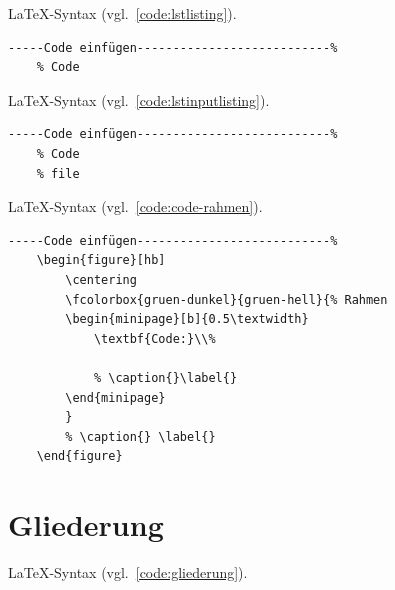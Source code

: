 \LaTeX -Syntax (vgl.~\ref{code:lstlisting}). 

\begin{lstlisting}[caption={lstlisting},label={code:lstlisting},language=TeX% C, TeX, Bash, Python
]-----Code einfügen---------------------------%
	% Code
\end{lstlisting}




\LaTeX -Syntax (vgl.~\ref{code:lstinputlisting}). 

\begin{lstlisting}[caption={lstinputlisting},label={code:lstinputlisting},language=TeX% C, TeX, Bash, Python
]-----Code einfügen---------------------------%
	% Code
	% file
\end{lstlisting}

\clearpage
\begin{figure}[hb]
	\centering
\end{figure}

\LaTeX -Syntax (vgl.~\ref{code:code-rahmen}). 

\begin{lstlisting}[caption={Code im Rahmen},label={code:code-rahmen},language=TeX% C, TeX, Bash, Python
]-----Code einfügen---------------------------%
	\begin{figure}[hb]
		\centering
		\fcolorbox{gruen-dunkel}{gruen-hell}{% Rahmen
		\begin{minipage}[b]{0.5\textwidth} 
			\textbf{Code:}\\%
			
			% \caption{}\label{}
		\end{minipage}
		}
		% \caption{} \label{}
	\end{figure}
\end{lstlisting}

\clearpage
\section{Gliederung}

\LaTeX -Syntax (vgl.~\ref{code:gliederung}).

